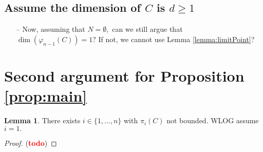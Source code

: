 \documentclass[11pt]{article}
\theoremstyle{definition}
\newtheorem{lemma}{Lemma}
\newcommand{\vp}{\varphi}
\def\td{(\textcolor{red}{{\bf todo}})}
\def\td{(\textcolor{red}{{\bf todo}}) }
\begin{document}
\subsection*{Assume the dimension of $C$ is $d\geq 1$}
\begin{itemize} 
    \item[--] Now, assuming that $N= \emptyset,$ can we still argue that $\dim(\vp_{n-1}(C))=1?$ If not, we cannot use Lemma \ref{lemma:limitPoint}?
\end{itemize} 



\section*{Second argument for Proposition \ref{prop:main}}
\begin{lemma}
    There exists $i \in \{1,\hdots,n\}$ with $\pi_i(C)$ not bounded. WLOG assume $i=1.$
\end{lemma}
\begin{proof}
    \td
\end{proof}





\end{document}
